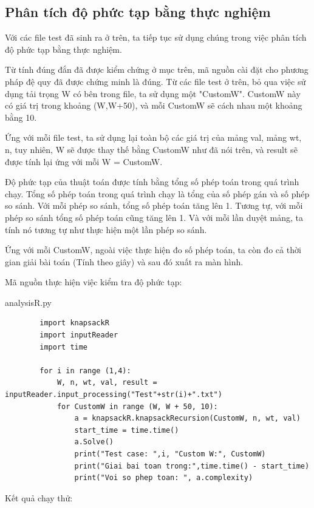 \documentclass[12pt,a4paper]{report}
\begin{document}
    \subsection{Phân tích độ phức tạp bằng thực nghiệm}
    Với các file test đã sinh ra ở trên, ta tiếp tục sử dụng chúng trong việc phân
    tích độ phức tạp bằng thực nghiệm.

    Từ tính đúng đắn đã được kiểm chứng ở mục trên, mã nguồn cài đặt cho phương 
    pháp đệ quy đã được chứng minh là đúng. Từ các file test ở trên, bỏ qua việc sử 
    dụng tải trọng W có bên trong file, ta sử dụng một "CustomW". CustomW này 
    có giá trị trong khoảng (W,W+50), và mỗi CustomW sẽ cách nhau một khoảng bằng 10. 

    Ứng với mỗi file test, ta sử dụng lại toàn bộ các giá trị của mảng val, mảng wt,
    n, tuy nhiên, W sẽ được thay thế bằng CustomW như đã nói trên, và result sẽ được
    tính lại ứng với mỗi W = CustomW.

    Độ phức tạp của thuật toán được tính bằng tổng số phép toán trong quá trình chạy.
    Tổng số phép toán trong quá trình chạy là tổng của số phép gán và số phép so sánh.
    Với mỗi phép so sánh, tổng số phép toán tăng lên 1. Tương tự, với mỗi phép so sánh
    tổng số phép toán cũng tăng lên 1. Và với mỗi lần duyệt mảng, ta tính nó tương tự 
    như thực hiện một lần phép so sánh.

    Ứng với mỗi CustomW, ngoài việc thực hiện đo số phép toán, ta còn đo cả thời gian 
    giải bài toán (Tính theo giây) và sau đó xuất ra màn hình.


    Mã nguồn thực hiện việc kiểm tra độ phức tạp:


    analysisR.py
    \begin{lstlisting}
        import knapsackR
        import inputReader
        import time

        for i in range (1,4):
            W, n, wt, val, result = inputReader.input_processing("Test"+str(i)+".txt")
            for CustomW in range (W, W + 50, 10):
                a = knapsackR.knapsackRecursion(CustomW, n, wt, val)
                start_time = time.time()
                a.Solve()
                print("Test case: ",i, "Custom W:", CustomW)
                print("Giai bai toan trong:",time.time() - start_time)
                print("Voi so phep toan: ", a.complexity)
    \end{lstlisting}

    Kết quả chạy thử:
\end{document}
